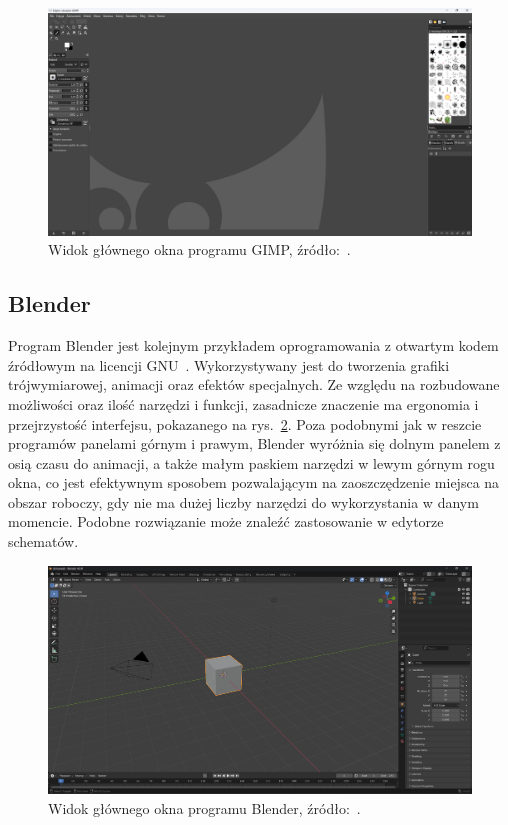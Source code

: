 \begin{figure}[h]
    \centering
    \includegraphics[width=.9\textwidth]{chapters/chapter2/img/gimp}
    \caption[Widok głównego okna programu GIMP.]{Widok głównego okna programu GIMP, źródło:~\cite{gimp_site}.}
    \label{fig:gimp_okno}
\end{figure}

\subsection{Blender}
\label{subsec:blender}

Program Blender jest kolejnym przykładem oprogramowania z otwartym kodem źródłowym na licencji GNU~\cite{blender_site}.
Wykorzystywany jest do tworzenia grafiki trójwymiarowej, animacji oraz efektów specjalnych.
Ze względu na rozbudowane możliwości oraz ilość narzędzi i funkcji,
zasadnicze znaczenie ma ergonomia i przejrzystość interfejsu, pokazanego na rys.~\ref{fig:blender_okno}.
Poza podobnymi jak w reszcie programów panelami górnym i prawym,
Blender wyróżnia się dolnym panelem z osią czasu do animacji, a także małym paskiem narzędzi w lewym górnym rogu okna,
co jest efektywnym sposobem pozwalającym na zaoszczędzenie miejsca na obszar roboczy,
gdy nie ma dużej liczby narzędzi do wykorzystania w danym momencie.
Podobne rozwiązanie może znaleźć zastosowanie w edytorze schematów.

\begin{figure}[h]
    \centering
    \includegraphics[width=.9\textwidth]{chapters/chapter2/img/blender}
    \caption[Widok głównego okna programu Blender.]{Widok głównego okna programu Blender, źródło:~\cite{blender_site}.}
    \label{fig:blender_okno}
\end{figure}

